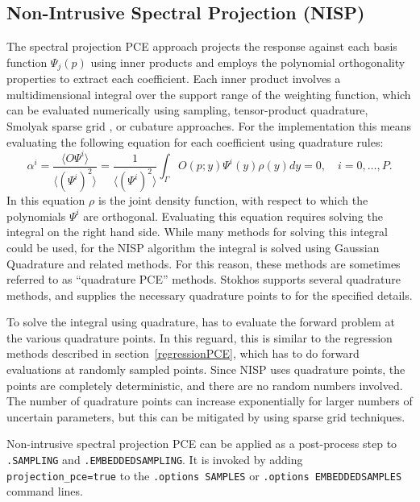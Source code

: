 \clearpage
\subsection{Non-Intrusive Spectral Projection (NISP)}
\label{nisp}

The spectral projection PCE approach projects the response
against each basis function $\Psi_j(p)$ using inner
products and employs the polynomial orthogonality properties to
extract each coefficient. Each inner product involves a
multidimensional integral over the support range of the weighting
function, which can be evaluated numerically using sampling,
tensor-product quadrature, Smolyak sparse grid \cite{Smolyak_63}, or
cubature \cite{stroud} approaches.   For the \Xyce{} implementation 
this means evaluating the following equation for each coefficient using 
quadrature rules:
\begin{equation}
\alpha^{i} = \frac{\langle O\varPsi ^{i}\rangle} {\langle (\varPsi ^{i})^{2}\rangle} = \frac{1} {\langle (\varPsi^{i})^{2}\rangle}\int _{\varGamma}O(p ;y)\varPsi ^{i}(y)\rho (y)dy = 0,\quad i = 0,\ldots,P.
  \label{nispProjection}
\end{equation}
In this equation $\rho$ is the joint density function, with respect to which the polynomials $\varPsi^i$ are orthogonal.
Evaluating this equation requires solving the integral on the right hand side.  
While many methods for solving this integral could be used, for the NISP algorithm 
the integral is solved using Gaussian Quadrature and related methods.  For this 
reason, these methods are sometimes referred to as ``quadrature PCE'' methods.
Stokhos supports several quadrature methods, and supplies the necessary quadrature points 
to \Xyce{} for the specified details.  

To solve the integral using quadrature, \Xyce{} has to evaluate the forward problem at 
the various quadrature points. In this reguard, this is similar to the
regression methods described in section~\ref{regressionPCE}, which has to do 
forward evaluations at randomly sampled points.
Since NISP uses quadrature points, the points are completely deterministic, 
and there are no random numbers involved.
The number of quadrature points can increase exponentially for larger numbers of uncertain 
parameters, but this can be mitigated by using sparse grid techniques.  

Non-intrusive spectral projection PCE can be applied as a post-process step 
to \texttt{.SAMPLING} and \texttt{.EMBEDDEDSAMPLING}.  It is invoked by adding 
\texttt{projection\_pce=true} to the \texttt{.options SAMPLES} 
or \texttt{.options EMBEDDEDSAMPLES} command lines.

